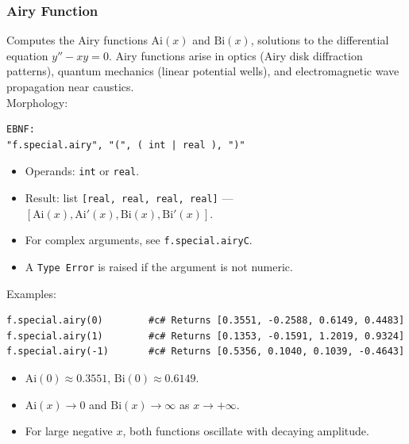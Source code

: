 \subsubsection{Airy Function}
Computes the Airy functions $\text{Ai}(x)$ and $\text{Bi}(x)$, solutions to the differential equation $y'' - xy = 0$. Airy functions arise in optics (Airy disk diffraction patterns), quantum mechanics (linear potential wells), and electromagnetic wave propagation near caustics. \\
Morphology:
\begin{verbatim}
EBNF:
"f.special.airy", "(", ( int | real ), ")"
\end{verbatim}
\begin{itemize}
\item Operands: \texttt{int} or \texttt{real}.
\item Result: list \texttt{[real, real, real, real]} --- $[\text{Ai}(x), \text{Ai}'(x), \text{Bi}(x), \text{Bi}'(x)]$.
\item For complex arguments, see \texttt{f.special.airyC}.
\item A \texttt{Type Error} is raised if the argument is not numeric.
\end{itemize}
Examples:
\begin{verbatim}
f.special.airy(0)        #c# Returns [0.3551, -0.2588, 0.6149, 0.4483]
f.special.airy(1)        #c# Returns [0.1353, -0.1591, 1.2019, 0.9324]
f.special.airy(-1)       #c# Returns [0.5356, 0.1040, 0.1039, -0.4643]
\end{verbatim}
\begin{itemize}
\item $\text{Ai}(0) \approx 0.3551$, $\text{Bi}(0) \approx 0.6149$.
\item $\text{Ai}(x) \to 0$ and $\text{Bi}(x) \to \infty$ as $x \to +\infty$.
\item For large negative $x$, both functions oscillate with decaying amplitude.
\end{itemize}

